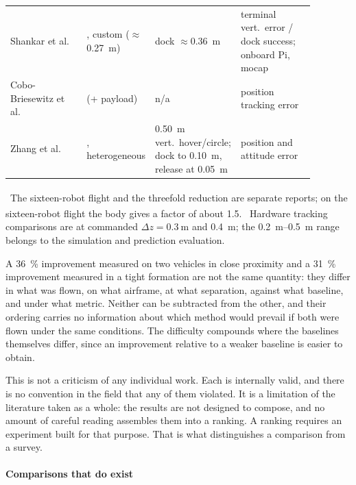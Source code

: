 \begin{table}[t]
\begin{tabular}{@{}>{\raggedright\arraybackslash}p{0.26\linewidth}>{\raggedright\arraybackslash}p{0.15\linewidth}>{\raggedright\arraybackslash}p{0.22\linewidth}>{\raggedright\arraybackslash}p{0.25\linewidth}@{}}
    Shankar et al.~\cite{shankar2023docking}    & 2, custom (\(\approx\)\SI{0.27}{\metre}) & dock \(\approx\)\SI{0.36}{\metre} & terminal vert.\ error / dock success; onboard Pi, mocap \\
    Cobo-Briesewitz et al.~\cite{cobobriesewitz2026lindi} & 1 (+ payload) & n/a                 & position tracking error \\
    Zhang et al.~\cite{zhang2024proxfly}        & 2, heterogeneous   & \SI{0.50}{\metre} vert.\ hover/circle; dock to \SI{0.10}{\metre}, release at \SI{0.05}{\metre} & position and attitude error \\
    \bottomrule
  \end{tabular}

  \vspace{0.4em}
  \begin{minipage}{\linewidth}\footnotesize
    \textsuperscript{\dag}~The sixteen-robot flight and the threefold reduction are separate
    reports; on the sixteen-robot flight the body gives a factor of about \num{1.5}.
    \textsuperscript{\ddag}~Hardware tracking comparisons are at commanded
    \(\Delta z = \SI{0.3}{\metre}\) and \SI{0.4}{\metre}; the \SIrange{0.2}{0.5}{\metre} range
    belongs to the simulation and prediction evaluation.
  \end{minipage}
\end{table}

A \SI{36}{\percent} improvement measured on two vehicles in close proximity and a
\SI{31}{\percent} improvement measured in a tight formation are not the same quantity: they differ
in what was flown, on what airframe, at what separation, against what baseline, and under what
metric. Neither can be subtracted from the other, and their ordering carries no information about
which method would prevail if both were flown under the same conditions. The difficulty compounds
where the baselines themselves differ, since an improvement relative to a weaker baseline is
easier to obtain.

This is not a criticism of any individual work. Each is internally valid, and there is no
convention in the field that any of them violated. It is a limitation of the literature taken as a
whole: the results are not designed to compose, and no amount of careful reading assembles them
into a ranking. A ranking requires an experiment built for that purpose. That is what distinguishes
a comparison from a survey.

\label{sec:rw-existing-comparisons}
\paragraph{Comparisons that do exist}


